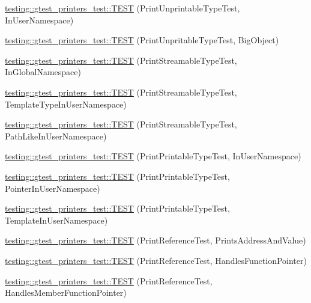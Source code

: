 \begin{DoxyCompactItemize}
\item 
\mbox{\hyperlink{namespacetesting_1_1gtest__printers__test_a0aa1499e978bdde6c71e49ecc9db695b}{testing\+::gtest\+\_\+printers\+\_\+test\+::\+T\+E\+ST}} (Print\+Unprintable\+Type\+Test, In\+User\+Namespace)
\item 
\mbox{\hyperlink{namespacetesting_1_1gtest__printers__test_a6b6fba2a191094244f8aa78a4933a2c5}{testing\+::gtest\+\_\+printers\+\_\+test\+::\+T\+E\+ST}} (Print\+Unpritable\+Type\+Test, Big\+Object)
\item 
\mbox{\hyperlink{namespacetesting_1_1gtest__printers__test_a80fe9d71227a97b12fd5336a823c3d17}{testing\+::gtest\+\_\+printers\+\_\+test\+::\+T\+E\+ST}} (Print\+Streamable\+Type\+Test, In\+Global\+Namespace)
\item 
\mbox{\hyperlink{namespacetesting_1_1gtest__printers__test_a8ccd96504d676671a0429073d5012ff1}{testing\+::gtest\+\_\+printers\+\_\+test\+::\+T\+E\+ST}} (Print\+Streamable\+Type\+Test, Template\+Type\+In\+User\+Namespace)
\item 
\mbox{\hyperlink{namespacetesting_1_1gtest__printers__test_a243b88c8a03fb501c573c25da302ca98}{testing\+::gtest\+\_\+printers\+\_\+test\+::\+T\+E\+ST}} (Print\+Streamable\+Type\+Test, Path\+Like\+In\+User\+Namespace)
\item 
\mbox{\hyperlink{namespacetesting_1_1gtest__printers__test_a52f5df394111bcc55aecc59ce426088d}{testing\+::gtest\+\_\+printers\+\_\+test\+::\+T\+E\+ST}} (Print\+Printable\+Type\+Test, In\+User\+Namespace)
\item 
\mbox{\hyperlink{namespacetesting_1_1gtest__printers__test_a3da6191eff6b016540024c2bfccdd90b}{testing\+::gtest\+\_\+printers\+\_\+test\+::\+T\+E\+ST}} (Print\+Printable\+Type\+Test, Pointer\+In\+User\+Namespace)
\item 
\mbox{\hyperlink{namespacetesting_1_1gtest__printers__test_aa697a3cf25b7f51f26ab49ed8ac3dd31}{testing\+::gtest\+\_\+printers\+\_\+test\+::\+T\+E\+ST}} (Print\+Printable\+Type\+Test, Template\+In\+User\+Namespace)
\item 
\mbox{\hyperlink{namespacetesting_1_1gtest__printers__test_aeae9b61a9fe582c72580db1466631846}{testing\+::gtest\+\_\+printers\+\_\+test\+::\+T\+E\+ST}} (Print\+Reference\+Test, Prints\+Address\+And\+Value)
\item 
\mbox{\hyperlink{namespacetesting_1_1gtest__printers__test_aab47074bb60b087e80675a44ad8c88ba}{testing\+::gtest\+\_\+printers\+\_\+test\+::\+T\+E\+ST}} (Print\+Reference\+Test, Handles\+Function\+Pointer)
\item 
\mbox{\hyperlink{namespacetesting_1_1gtest__printers__test_a88f9089e0b19be4bda74a953d6a47d7b}{testing\+::gtest\+\_\+printers\+\_\+test\+::\+T\+E\+ST}} (Print\+Reference\+Test, Handles\+Member\+Function\+Pointer)

\end{DoxyCompactItemize}
